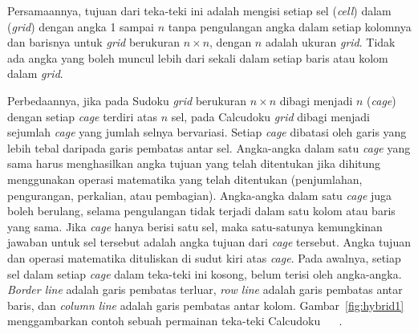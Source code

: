 Persamaannya, tujuan dari teka-teki ini adalah mengisi setiap sel (\textit{cell}) dalam (\textit{grid}) dengan angka 1 sampai \begin{math}n\end{math} tanpa pengulangan angka dalam setiap kolomnya dan barisnya untuk \textit{grid} berukuran \begin{math}n \times n\end{math}, dengan \begin{math}n\end{math} adalah ukuran \textit{grid}. Tidak ada angka yang boleh muncul lebih dari sekali dalam setiap baris atau kolom dalam \textit{grid}.

Perbedaannya, jika pada Sudoku \textit{grid} berukuran \begin{math}n \times n\end{math} dibagi menjadi \begin{math}n\end{math} (\textit{cage}) dengan setiap \textit{cage} terdiri atas \begin{math}n\end{math} sel, pada Calcudoku \textit{grid} dibagi menjadi sejumlah \textit{cage} yang jumlah selnya bervariasi. Setiap \textit{cage} dibatasi oleh garis yang lebih tebal daripada garis pembatas antar sel. Angka-angka dalam satu \textit{cage} yang sama harus menghasilkan angka tujuan yang telah ditentukan jika dihitung menggunakan operasi matematika yang telah ditentukan (penjumlahan, pengurangan, perkalian, atau pembagian). Angka-angka dalam satu \textit{cage} juga boleh berulang, selama pengulangan tidak terjadi dalam satu kolom atau baris yang sama. Jika \textit{cage} hanya berisi satu sel, maka satu-satunya kemungkinan jawaban untuk sel tersebut adalah angka tujuan dari \textit{cage} tersebut. Angka tujuan dan operasi matematika dituliskan di sudut kiri atas \textit{cage}. Pada awalnya, setiap sel dalam setiap \textit{cage} dalam teka-teki ini kosong, belum terisi oleh angka-angka. \textit{Border line} adalah garis pembatas terluar, \textit{row line} adalah garis pembatas antar baris, dan \textit{column line} adalah garis pembatas antar kolom. Gambar~\ref{fig:hybrid1} menggambarkan contoh sebuah permainan teka-teki Calcudoku ~\cite{fahda:16:backtracking} ~\cite{johanna:12:hybrid}.

